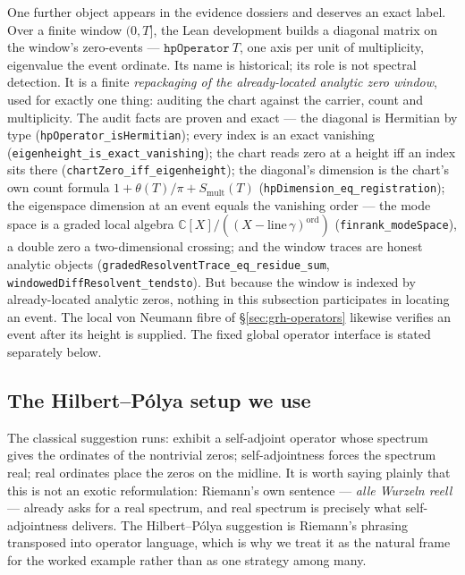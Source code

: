 One further object appears in the evidence dossiers and deserves an exact
label. Over a finite window \((0,T]\), the Lean development builds a
diagonal matrix on the window's zero-events --- \(\texttt{hpOperator}\ T\),
one axis per unit of multiplicity, eigenvalue the event ordinate. Its name
is historical; its role is not spectral detection. It is a finite
\emph{repackaging of the already-located analytic zero window}, used for
exactly one thing: auditing the chart against the carrier, count and
multiplicity. The audit facts are proven and exact --- the diagonal is
Hermitian by type (\texttt{hpOperator\_isHermitian}); every index is an
exact vanishing (\texttt{eigenheight\_is\_exact\_vanishing}); the chart
reads zero at a height iff an index sits there
(\texttt{chartZero\_iff\_eigenheight}); the diagonal's dimension is the
chart's own count formula \(1+\theta(T)/\pi+S_{\mathrm{mult}}(T)\)
(\texttt{hpDimension\_eq\_registration}); the eigenspace dimension at an
event equals the vanishing order --- the mode space is a graded local
algebra \(\mathbb C[X]/((X-\mathrm{line}\,\gamma)^{\mathrm{ord}})\)
(\texttt{finrank\_modeSpace}), a double zero a two-dimensional crossing;
and the window traces are honest analytic objects
(\texttt{gradedResolventTrace\_eq\_residue\_sum},
\texttt{windowedDiffResolvent\_tendsto}). But because the window is indexed
by already-located analytic zeros, nothing in this subsection participates
in locating an event.  The local von Neumann fibre of
\S\ref{sec:grh-operators} likewise verifies an event after its height is
supplied.  The fixed global operator interface is stated separately below.

\subsection{The Hilbert--P\'olya setup we use}\label{sec:grh-hp-setup}

The classical suggestion runs: exhibit a self-adjoint operator whose spectrum
gives the ordinates of the nontrivial zeros; self-adjointness forces the
spectrum real; real ordinates place the zeros on the midline. It is worth
saying plainly that this is not an exotic reformulation: Riemann's own
sentence --- \emph{alle Wurzeln reell} --- already asks for a real spectrum,
and real spectrum is precisely what self-adjointness delivers. The
Hilbert--P\'olya suggestion is Riemann's phrasing transposed into operator
language, which is why we treat it as the natural frame for the worked
example rather than as one strategy among many.

